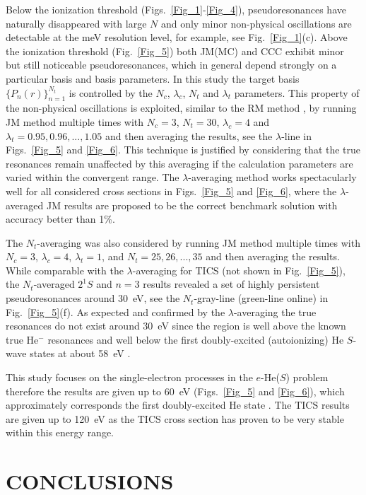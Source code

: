 \documentclass[aip
, pra
, showpacs
, aps
, twocolumn
, groupedaddress
, floatfix
]{revtex4}
\begin{document}
Below the ionization threshold (Figs.~\ref{Fig_1}-\ref{Fig_4}), pseudoresonances have naturally disappeared with large $N$
and only minor non-physical oscillations are detectable at the meV resolution level, for example, see Fig.~\ref{Fig_1}(c).
Above the ionization threshold (Fig.~\ref{Fig_5}) both JM(MC) and CCC exhibit minor but still noticeable pseudoresonances,
which in general depend strongly on a particular basis and basis parameters.
In this study the target basis $\{P_n(r)\}_{n=1}^{N_t}$ is controlled by the $N_c$, $\lambda_c$, $N_t$ and $\lambda_t$ parameters.
This property of the non-physical oscillations is exploited, similar to the RM method \cite{BB97},
by running JM method multiple times with $N_c=3$, $N_t=30$, $\lambda_c=4$ and $ \lambda_t = 0.95, 0.96, ..., 1.05$ and then averaging
the results, see the $\lambda$-line in Figs.~\ref{Fig_5} and \ref{Fig_6}.
This technique is justified by considering that the true resonances remain unaffected by this averaging if the calculation parameters are varied within the convergent range.
The $\lambda$-averaging method works spectacularly well for all considered cross sections in Figs.~\ref{Fig_5} and \ref{Fig_6},
where the $\lambda$-averaged JM results are proposed to be the correct benchmark solution with accuracy better than 1\%.

The $N_t$-averaging was also considered by running JM method multiple times with $N_c=3$, $\lambda_c=4$, 
$\lambda_t=1$, and $N_t = 25,26, ..., 35$ and then averaging the results.
While comparable with the $\lambda$-averaging for TICS (not shown in Fig.~\ref{Fig_5}), the $N_t$-averaged $2^1S$ and $n=3$ 
results revealed a set of highly persistent pseudoresonances around 30~eV, see the $N_t$-gray-line (green-line online) in Fig.~\ref{Fig_5}(f).
As expected and confirmed by the $\lambda$-averaging the true resonances do not exist
around 30~eV since the region is well above the known true He$^-$ resonances \cite{BC94} and well below the first doubly-excited (autoionizing) He $S$-wave states at about 58~eV \cite{BS10p022715,EUO77}.


This study focuses on the single-electron processes in the $e$-He($S$) problem therefore
the results are given up to 60~eV (Figs.~\ref{Fig_5} and \ref{Fig_6}), which approximately 
corresponds the first doubly-excited He state \cite{BS10p022715,EUO77}. 
The TICS results are given up to 120~eV as the TICS cross section has proven to be very stable within this energy range.


\section{CONCLUSIONS}
\end{document}
